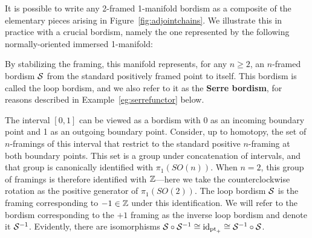 \documentclass{amsart}
\begin{document}
It is possible to write any 2-framed 1-manifold bordism as a composite of the elementary pieces arising in Figure~\ref{fig:adjointchains}.  We illustrate this in practice with a crucial bordism, namely the one represented by the following normally-oriented immersed 1-manifold:
\begin{center}
\end{center}
By stabilizing the framing, this manifold represents, for any $n \geq 2$, an $n$-framed bordism $\mathcal S$ from the standard positively framed point to itself.  This bordism is called the loop bordism, and we also refer to it as the {\bfseries Serre bordism}, for reasons described in Example~\ref{eg:serrefunctor} below.

\begin{remark}
The interval $[0,1]$ can be viewed as a bordism with 0 as an incoming boundary point and 1 as an outgoing boundary point.  Consider, up to homotopy, the set of $n$-framings of this interval that restrict to the standard positive $n$-framing at both boundary points.  This set is a group under concatenation of intervals, and that group is canonically identified with $\pi_1(SO(n))$.  When $n=2$, this group of framings is therefore identified with $\mathbb Z$---here we take the counterclockwise rotation as the positive generator of $\pi_1(SO(2))$.  The loop bordism $\mathcal S$ is the framing corresponding to $-1 \in \mathbb Z$ under this identification.  We will refer to the bordism corresponding to the $+1$ framing as the inverse loop bordism and denote it $\mathcal S^{-1}$.  Evidently, there are isomorphisms $\mathcal S \circ \mathcal S^{-1} \cong \mathrm{id}_{\mathrm{pt}_+} \cong \mathcal S^{-1} \circ \mathcal S$.
\end{remark}
\end{document}
